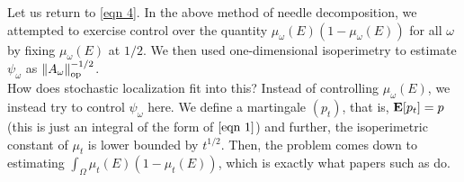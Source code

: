 \documentclass{article}
\begin{document}
Let us return to \eqref{eqn 4}. In the above method of needle decomposition, we attempted to exercise control over the quantity $\mu_\omega(E) ( 1 - \mu_\omega(E) )$ for all $\omega$ by fixing $\mu_\omega(E)$ at $1/2$. We then used one-dimensional isoperimetry to estimate $\psi_\omega$ as $\left\lVert A_\omega\right\rVert_{\text{op}}^{-1/2}$.\\
How does stochastic localization fit into this? Instead of controlling $\mu_\omega(E)$, we instead try to control $\psi_\omega$ here. We define a martingale $(p_t)$, that is, $\textbf{E}[p_t] = p$ (this is just an integral of the form of $\eqref{eqn 1}$) and further, the isoperimetric constant of $\mu_t$ is lower bounded by $t^{1/2}$. Then, the problem comes down to estimating
$\int_\Omega \mu_t(E) ( 1 - \mu_t(E) )$, which is exactly what papers such as \cite{chen2021constant} do.




\end{document}
